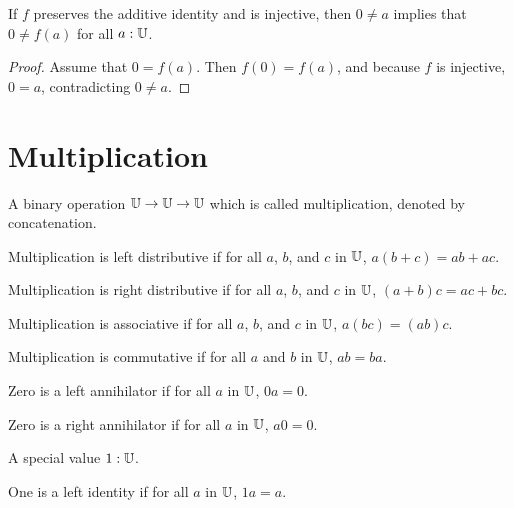 \documentclass[../math.tex]{subfiles}
\begin{document}
\begin{theorem} \label{homo_inj_zero}
    If $f$ preserves the additive identity and is injective, then $0 \neq a$
    implies that $0 \neq f(a)$ for all $a : \mathbb{U}$.
\end{theorem}
\begin{proof}
    Assume that $0 = f(a)$.  Then $f(0) = f(a)$, and because $f$ is injective,
    $0 = a$, contradicting $0 \neq a$.
\end{proof}

\section{Multiplication}

\begin{class} \label{mult}
    A binary operation $\mathbb{U} \rightarrow \mathbb{U} \rightarrow \mathbb{U}$ which is called
    multiplication, denoted by concatenation.
\end{class}

\begin{class}
    Multiplication is left distributive if for all $a$, $b$, and $c$ in $\mathbb{U}$,
    $a(b + c) = ab + ac$.
\end{class}

\begin{class}
    Multiplication is right distributive if for all $a$, $b$, and $c$ in $\mathbb{U}$,
    $(a + b)c = ac + bc$.
\end{class}

\begin{class}
    Multiplication is associative if for all $a$, $b$, and $c$ in $\mathbb{U}$, $a(bc) =
    (ab)c$.
\end{class}

\begin{class}
    Multiplication is commutative if for all $a$ and $b$ in $\mathbb{U}$, $ab = ba$.
\end{class}

\begin{class}
    Zero is a left annihilator if for all $a$ in $\mathbb{U}$, $0a = 0$.
\end{class}

\begin{class}
    Zero is a right annihilator if for all $a$ in $\mathbb{U}$, $a0 = 0$.
\end{class}

\begin{class}
    A special value $1 : \mathbb{U}$.
\end{class}

\begin{class}
    One is a left identity if for all $a$ in $\mathbb{U}$, $1a = a$.
\end{class}
\end{document}
